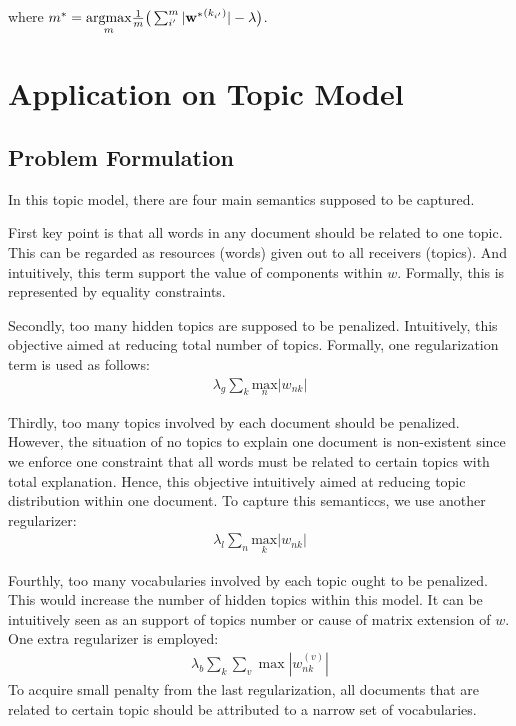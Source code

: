 \documentclass{article} %
\newcommand{\argmax}[1]{\underset{#1}{\text{argmax} }}
\newcommand{\sumn}{\sum_{n}}
\newcommand{\sumk}{\sum_{k}}
\newcommand{\wnk}{w_{nk}}
\newcommand{\wopt}{\mathbf{w^{*}}}
\newcommand{\maxn}{ \underset{n}{\text{max}} }
\newcommand{\maxk}{ \underset{k}{\text{max}} }
\begin{document}
where $\ms = \argmax{m} \frac{1}{m} \big(\sum_{i'}^{m} |\wopt^{(k_{i'})}| -
\lambda \big)$.

\newpage
\section{Application on Topic Model}
\newcommand{\lambdag}{\lambda_g}
\newcommand{\lambdal}{\lambda_l}
\newcommand{\lambdab}{\lambda_b}


\subsection{Problem Formulation}
In this topic model, there are four main semantics supposed to be captured.

First key point is that all words in any document should be related to one
topic. This can be regarded as resources (words) given out to all receivers
(topics). And intuitively, this term support the value of components within
$w$. Formally, this is represented by equality constraints.

Secondly, too many hidden topics are supposed to be penalized. Intuitively,
this objective aimed at reducing total number of topics. Formally, one
regularization term is used as follows: 
\begin{align}
   \lambdag \sumk \maxn |\wnk| 
\end{align}

Thirdly, too many topics involved by each document should be penalized.
However, the situation of no topics to explain one document is
non-existent since we enforce one constraint that all words must be related to
certain topics with total explanation.  Hence, this objective intuitively
aimed at reducing topic distribution within one document. To capture this
semanticcs, we use another regularizer:
\begin{align}
\lambdal \sumn \maxk |\wnk|
\end{align}

Fourthly, too many vocabularies involved by each topic ought to be penalized.
This would increase the number of hidden topics within this model. It can be
intuitively seen as an support of topics number or cause of matrix extension
of $w$. One extra regularizer is employed:
\begin{align}
\lambdab \sumk \sum_v \max |\wnk^{(v)}|
\end{align}
To acquire small penalty from the last regularization, all documents that are
related to certain topic should be attributed to a narrow set of vocabularies. 
\end{document}
